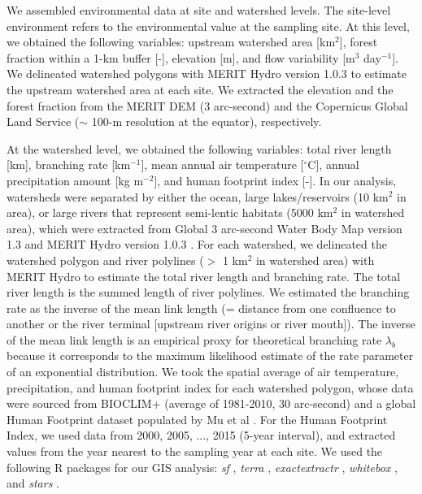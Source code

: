 \documentclass[11pt, class=article, crop=false]{standalone}
\begin{document}
We assembled environmental data at site and watershed levels.
The site-level environment refers to the environmental value at the sampling site.
At this level, we obtained the following variables: upstream watershed area [km$^2$], forest fraction within a 1-km buffer [-], elevation [m], and flow variability [m$^3$ day$^{-1}$].
We delineated watershed polygons with MERIT Hydro version 1.0.3 \citep{yamazaki_merit_2019} to estimate the upstream watershed area at each site.
We extracted the elevation and the forest fraction from the MERIT DEM (3 arc-second) and the Copernicus Global Land Service ($\sim$ 100-m resolution at the equator), respectively.

At the watershed level, we obtained the following variables: total river length [km], branching rate [km$^{-1}$], mean annual air temperature [$^\circ$C], annual precipitation amount [kg m$^{-2}$], and human footprint index [-].
In our analysis, watersheds were separated by either the ocean, large lakes/reservoirs (10 km$^{2}$ in area), or large rivers that represent semi-lentic habitats (5000 km$^{2}$ in watershed area), which were extracted from Global 3 arc-second Water Body Map version 1.3 \citep{yamazaki_development_2015} and MERIT Hydro version 1.0.3 \citep{yamazaki_merit_2019}.
For each watershed, we delineated the watershed polygon and river polylines ($>$ 1 km$^2$ in watershed area) with MERIT Hydro to estimate the total river length and branching rate.
The total river length is the summed length of river polylines.
We estimated the branching rate as the inverse of the mean link length (= distance from one confluence to another or the river terminal [upstream river origins or river mouth]).
The inverse of the mean link length is an empirical proxy for theoretical branching rate $\lambda_b$ because it corresponds to the maximum likelihood estimate of the rate parameter of an exponential distribution.
We took the spatial average of air temperature, precipitation, and human footprint index for each watershed polygon, whose data were sourced from BIOCLIM+ (average of 1981-2010, 30 arc-second) \citep{brun_global_2022} and a global Human Footprint dataset populated by Mu et al \citep{mu_global_2022}.
For the Human Footprint Index, we used data from 2000, 2005, ..., 2015 (5-year interval), and extracted values from the year nearest to the sampling year at each site.
We used the following R packages for our GIS analysis: \textit{sf} \citep{pebesma_simple_2018}, \textit{terra} \citep{hijmans_terra_2022}, \textit{exactextractr} \citep{baston_exactextractr_2020}, \textit{whitebox} \citep{lindsay_whitebox_2016}, and \textit{stars} \citep{pebesma_stars_2020}.
\end{document}
